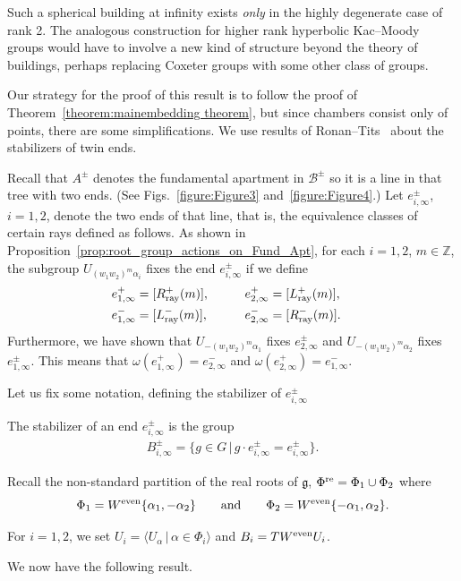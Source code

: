 \documentclass[pdftex]{sigma}
\numberwithin{equation}{section}
\def\Z{\mathbb{Z}}
\def\a{\alpha}
\def\roots{{\Phi}}
\def\cB{\mathcal B}
\def\fg{\mathfrak{g}}
\begin{document}
\begin{Remark}
Such a spherical building at infinity exists {\em only} in the highly degenerate case of rank 2. The analogous construction for higher
rank hyperbolic Kac--Moody groups would have to involve a new kind of structure beyond the theory of buildings, perhaps replacing
Coxeter groups with some other class of groups. \end{Remark}

Our strategy for the proof of this result is to follow the proof of Theorem~\ref{theorem:mainembedding theorem}, but since chambers consist only of points, there are some simplifications.
We use results of Ronan--Tits~\cite{RonanTits94} about the stabilizers of twin ends.

Recall that $A^{\pm}$ denotes the fundamental apartment in $\cB^\pm$ so it is a line in that tree with two ends. (See Figs.~\ref{figure:Figure3} and~\ref{figure:Figure4}.)
Let $e_{i,\infty}^\pm$, $i=1,2$, denote the two ends of that line, that is, the equivalence classes of certain rays defined as follows.
As shown in Proposition~\ref{prop:root_group_actions_on_Fund_Apt}, for each $i=1,2$, $m\in\Z$, the
subgroup $U_{(w_1 w_2)^m \a_i}$ fixes the end $e_{i,\infty}^\pm$ if we define
\begin{alignat*}{3}
& e_{1,\infty}^+ = [R_{\rm ray}^+(m)],\qquad && e_{2,\infty}^+ = [L_{\rm ray}^+(m)],& \\
& e_{1,\infty}^- = [L_{\rm ray}^-(m)],\qquad && e_{2,\infty}^- = [R_{\rm ray}^-(m)].&
\end{alignat*}
Furthermore, we have shown that $U_{-(w_1 w_2)^m \a_1}$ fixes $e_{2,\infty}^\pm$ and
$U_{-(w_1 w_2)^m \a_2}$ fixes $e_{1,\infty}^\pm$.
This means that $\omega(e_{1,\infty}^+) = e_{2,\infty}^-$ and $\omega(e_{2,\infty}^+) = e_{1,\infty}^-$.

Let us fix some notation, defining the stabilizer of $e_{i,\infty}^\pm$
\begin{Definition}\label{definition:end_stabilizers}
The stabilizer of an end $e_{i,\infty}^\pm$ is the group
\begin{gather*}
B_{i,\infty}^\pm = \big\{g\in G \,|\, g\cdot e_{i,\infty}^\pm=e_{i,\infty}^\pm \big\} .
\end{gather*}
\end{Definition}

Recall the non-standard partition of the real roots of $\fg$, $\roots^{\rm re} = \roots_1\cup \roots_2$ where
\[\roots_1 = W^{\rm even}\{\a_1,-\a_2\}\qquad\hbox{and}\qquad \roots_2 = W^{\rm even}\{-\a_1,\a_2\} .\]
\begin{Definition}\label{definition:nonstandard_root_groups}
For $i=1,2$, we set $U_i=\langle U_{\alpha}\,|\, \alpha\in \roots_i\rangle$ and $B_i = T W^{\rm even} U_i$.
\end{Definition}
We now have the following result.
\end{document}
